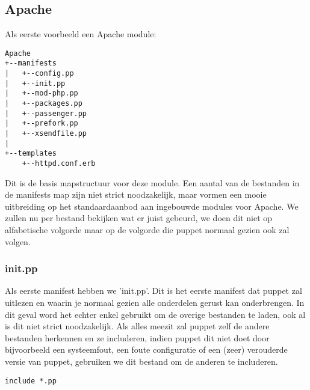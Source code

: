 \subsection{Apache}
Als eerste voorbeeld een Apache module:
%
\begin{code}
\begin{lstlisting}
Apache
+--manifests
|	+--config.pp
|	+--init.pp
|	+--mod-php.pp
|	+--packages.pp
|	+--passenger.pp
|	+--prefork.pp
|	+--xsendfile.pp
|
+--templates
	+--httpd.conf.erb
\end{lstlisting}
\end{code}
%
Dit is de basis mapstructuur voor deze module. Een aantal van de bestanden in de manifests map zijn niet strict noodzakelijk, maar vormen een mooie uitbreiding op het standaardaanbod aan ingebouwde modules voor Apache. We zullen nu per bestand bekijken wat er juist gebeurd, we doen dit niet op alfabetische volgorde maar op de volgorde die puppet normaal gezien ook zal volgen.
%
\subsubsection{init.pp}
Als eerste manifest hebben we 'init.pp'. Dit is het eerste manifest dat puppet zal uitlezen en waarin je normaal gezien alle onderdelen gerust kan onderbrengen. In dit geval word het echter enkel gebruikt om de overige bestanden te laden, ook al is dit niet strict noodzakelijk. Als alles meezit zal puppet zelf de andere bestanden herkennen en ze includeren, indien puppet dit niet doet door bijvoorbeeld een systeemfout, een foute configuratie of een (zeer) verouderde versie van puppet, gebruiken we dit bestand om de anderen te includeren.
\begin{code}
\begin{lstlisting}
include *.pp
\end{lstlisting}
\end{code}
%
